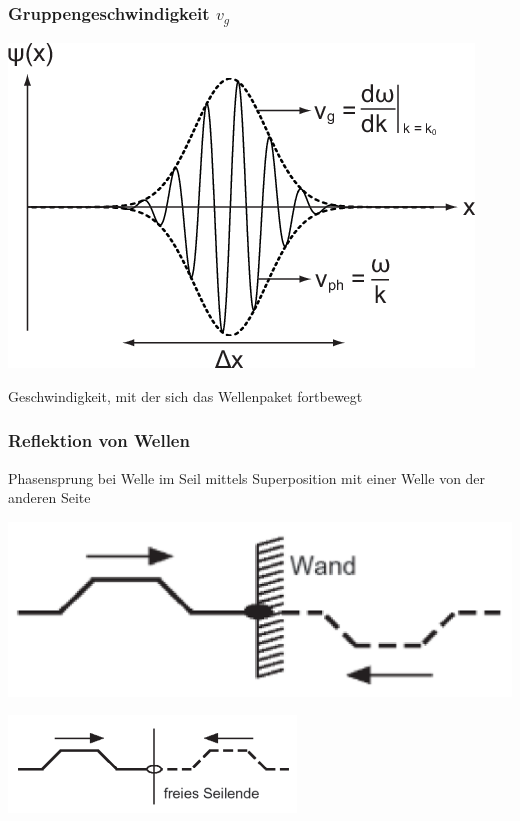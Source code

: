     \subsubsection{Gruppengeschwindigkeit $v_g$}
    \begin{minipage}{0.69\linewidth}
        \includegraphics[width = \linewidth]{src/images/gruppengeschwindigkeit.png}
    \end{minipage}
    \begin{minipage}{0.29\linewidth}
        Geschwindigkeit, mit der sich das Wellenpaket fortbewegt
    \end{minipage}
    
    \subsubsection{Reflektion von Wellen}
    Phasensprung bei Welle im Seil mittels Superposition mit einer Welle von der anderen Seite\\
    \begin{minipage}{0.49\linewidth}
        \includegraphics[width = \linewidth]{src/images/welle_superposition_wand.png}
    \end{minipage}
    \begin{minipage}{0.49\linewidth}
        \includegraphics[width = \linewidth]{src/images/welle_superposition_frei.png}
    \end{minipage}

